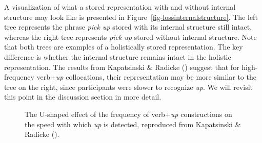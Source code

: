 \documentclass[
  12pt,
  letterpaper,
]{scrreport}
\begin{document}
A visualization of what a stored representation with and without
internal structure may look like is presented in
Figure~\ref{fig-lossinternalstructure}. The left tree represents the
phrase \emph{pick up} stored with its internal structure still intact,
whereas the right tree represents \emph{pick up} stored without internal
structure. Note that both trees are examples of a holistically stored
representation. The key difference is whether the internal structure
remains intact in the holistic representation. The results from
Kapatsinski \& Radicke
() suggest
that for high-frequency verb+\emph{up} collocations, their
representation may be more similar to the tree on the right, since
participants were slower to recognize \emph{up}. We will revisit this
point in the discussion section in more detail.

\begin{figure}[htbp]

\caption{\label{fig-kapatsinskiplot}The U-shaped effect of the frequency
of verb+\emph{up} constructions on the speed with which \emph{up} is
detected, reproduced from Kapatsinski \& Radicke
().}


\end{figure}%
\end{document}
